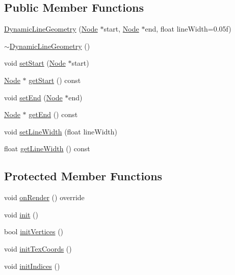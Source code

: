 \subsection*{Public Member Functions}
\begin{DoxyCompactItemize}
\item 
\mbox{\hyperlink{classec_1_1_dynamic_line_geometry_ade626d917fab310c550952b7086639bf}{Dynamic\+Line\+Geometry}} (\mbox{\hyperlink{classec_1_1_node}{Node}} $\ast$start, \mbox{\hyperlink{classec_1_1_node}{Node}} $\ast$end, float line\+Width=0.\+05f)
\item 
\mbox{\hyperlink{classec_1_1_dynamic_line_geometry_aee42706b172e0e76cd290a4ae6897740}{$\sim$\+Dynamic\+Line\+Geometry}} ()
\item 
void \mbox{\hyperlink{classec_1_1_dynamic_line_geometry_a7354615fc961c1d6d6e9ec09bdb5bdf9}{set\+Start}} (\mbox{\hyperlink{classec_1_1_node}{Node}} $\ast$start)
\item 
\mbox{\hyperlink{classec_1_1_node}{Node}} $\ast$ \mbox{\hyperlink{classec_1_1_dynamic_line_geometry_a84dfd0f92891d7030790976be8606d98}{get\+Start}} () const
\item 
void \mbox{\hyperlink{classec_1_1_dynamic_line_geometry_a95e48c0fcda2b81310f99b0dc113701b}{set\+End}} (\mbox{\hyperlink{classec_1_1_node}{Node}} $\ast$end)
\item 
\mbox{\hyperlink{classec_1_1_node}{Node}} $\ast$ \mbox{\hyperlink{classec_1_1_dynamic_line_geometry_a877ec687c19743cc67520b5a419bad74}{get\+End}} () const
\item 
void \mbox{\hyperlink{classec_1_1_dynamic_line_geometry_ad2a5b06e7ea10c771ed17ff0ffce4b3a}{set\+Line\+Width}} (float line\+Width)
\item 
float \mbox{\hyperlink{classec_1_1_dynamic_line_geometry_a0b32e465ad6a232b96dc3a0cd404ae62}{get\+Line\+Width}} () const
\end{DoxyCompactItemize}
\subsection*{Protected Member Functions}
\begin{DoxyCompactItemize}
\item 
void \mbox{\hyperlink{classec_1_1_dynamic_line_geometry_ab56984cee973ef2a73ff67339014f0cf}{on\+Render}} () override
\item 
void \mbox{\hyperlink{classec_1_1_dynamic_line_geometry_a015c2ecc62d63de4ddce1f1a23897bc1}{init}} ()
\item 
bool \mbox{\hyperlink{classec_1_1_dynamic_line_geometry_a4dced137976fc7b936bc80a8cb350b38}{init\+Vertices}} ()
\item 
void \mbox{\hyperlink{classec_1_1_dynamic_line_geometry_af556bfe516c6c93bc515f607bd3840b6}{init\+Tex\+Coords}} ()
\item 
void \mbox{\hyperlink{classec_1_1_dynamic_line_geometry_af622418944568bc0698d888024d4c2b0}{init\+Indices}} ()
\end{DoxyCompactItemize}
